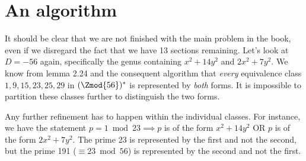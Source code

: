 \section{An algorithm}


It should be clear that we are not finished with the main problem in the book, even if we disregard the fact that we have 13 sections remaining. Let's look at $D=-56$ again, specifically the genus containing $x^2+14y^2$ and $2x^2+7y^2$. We know from lemma 2.24 and the consequent algorithm that \emph{every} equivalence class $1, 9, 15, 23, 25, 29$ in $(\Zmod{56})^*$ is represented by \emph{both} forms. It is impossible to partition these classes further to distinguish the two forms.

Any further refinement has to happen within the individual classes. For instance, we have the statement $p=1\bmod 23\implies p$ is of the form $x^2+14y^2$ OR $p$ is of the form $2x^2+7y^2$. The prime 23 is represented by the first and not the second, but the prime 191 ($\equiv 23\bmod 56$) is represented by the second and not the first.
